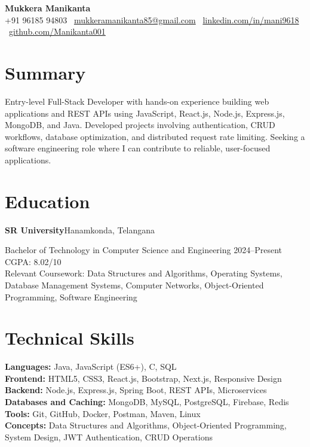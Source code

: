 \documentclass[10pt,letterpaper]{article}
\newcommand{\entry}[2]{\textbf{#1}\hfill #2\par}
\begin{document}
\begin{center}
    {\LARGE\bfseries Mukkera Manikanta}\\[3pt]
    +91 96185 94803 \textbar\
    \href{mailto:mukkeramanikanta85@gmail.com}{mukkeramanikanta85@gmail.com} \textbar\
    \href{https://linkedin.com/in/mani9618}{linkedin.com/in/mani9618} \textbar\
    \href{https://github.com/Manikanta001}{github.com/Manikanta001}
\end{center}

\section{Summary}
Entry-level Full-Stack Developer with hands-on experience building web applications and REST APIs using JavaScript, React.js, Node.js, Express.js, MongoDB, and Java. Developed projects involving authentication, CRUD workflows, database optimization, and distributed request rate limiting. Seeking a software engineering role where I can contribute to reliable, user-focused applications.

\section{Education}
\entry{SR University}{Hanamkonda, Telangana}
Bachelor of Technology in Computer Science and Engineering \hfill 2024--Present\\
CGPA: 8.02/10\\
Relevant Coursework: Data Structures and Algorithms, Operating Systems, Database Management Systems, Computer Networks, Object-Oriented Programming, Software Engineering

\section{Technical Skills}
\textbf{Languages:} Java, JavaScript (ES6+), C, SQL\\
\textbf{Frontend:} HTML5, CSS3, React.js, Bootstrap, Next.js, Responsive Design\\
\textbf{Backend:} Node.js, Express.js, Spring Boot, REST APIs, Microservices\\
\textbf{Databases and Caching:} MongoDB, MySQL, PostgreSQL, Firebase, Redis\\
\textbf{Tools:} Git, GitHub, Docker, Postman, Maven, Linux\\
\textbf{Concepts:} Data Structures and Algorithms, Object-Oriented Programming, System Design, JWT Authentication, CRUD Operations
\end{document}
